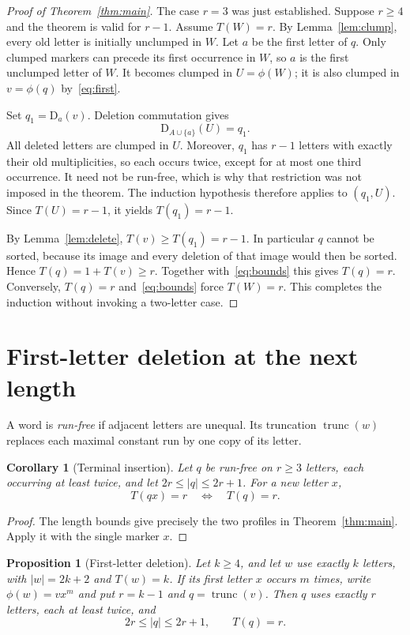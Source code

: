 \documentclass[11pt,a4paper]{article}
\newtheorem{corollary}[theorem]{Corollary}
\newtheorem{proposition}[theorem]{Proposition}
\DeclareMathOperator{\trunc}{trunc}
\newcommand{\D}{\mathrm{D}}
\begin{document}
\begin{proof}[Proof of Theorem~\ref{thm:main}]
The case $r=3$ was just established. Suppose $r\geq4$ and the theorem is
valid for $r-1$. Assume $T(W)=r$. By Lemma~\ref{lem:clump}, every old letter
is initially unclumped in $W$. Let $a$ be the first letter of $q$. Only
clumped markers can precede its first occurrence in $W$, so $a$ is the
first unclumped letter of $W$. It becomes clumped in $U=\phi(W)$; it is
also clumped in $v=\phi(q)$ by~\eqref{eq:first}.

Set $q_1=\D_a(v)$. Deletion commutation gives
\[
 \D_{A\cup\{a\}}(U)=q_1.
\]
All deleted letters are clumped in $U$. Moreover, $q_1$ has $r-1$ letters
with exactly their old multiplicities, so each occurs twice, except for at
most one third occurrence. It need not be run-free, which is why that
restriction was not imposed in the theorem. The induction hypothesis
therefore applies to $(q_1,U)$. Since $T(U)=r-1$, it yields $T(q_1)=r-1$.

By Lemma~\ref{lem:delete}, $T(v)\geq T(q_1)=r-1$. In particular $q$ cannot
be sorted, because its image and every deletion of that image would then
be sorted. Hence $T(q)=1+T(v)\geq r$. Together with~\eqref{eq:bounds} this
gives $T(q)=r$. Conversely, $T(q)=r$ and~\eqref{eq:bounds} force $T(W)=r$.
This completes the induction without invoking a two-letter case.
\end{proof}

\section{First-letter deletion at the next length}\label{sec:application}

A word is \emph{run-free} if adjacent letters are unequal. Its truncation
$\trunc(w)$ replaces each maximal constant run by one copy of its letter.

\begin{corollary}[Terminal insertion]\label{cor:terminal}
Let $q$ be run-free on $r\geq3$ letters, each occurring at least twice, and
let $2r\leq|q|\leq2r+1$. For a new letter $x$,
\[
 T(qx)=r\quad\Longleftrightarrow\quad T(q)=r.
\]
\end{corollary}

\begin{proof}
The length bounds give precisely the two profiles in
Theorem~\ref{thm:main}. Apply it with the single marker $x$.
\end{proof}

\begin{proposition}[First-letter deletion]\label{prop:application}
Let $k\geq4$, and let $w$ use exactly $k$ letters, with $|w|=2k+2$ and
$T(w)=k$. If its first letter $x$ occurs $m$ times, write
$\phi(w)=v x^m$ and put $r=k-1$ and $q=\trunc(v)$. Then $q$ uses exactly
$r$ letters, each at least twice, and
\[
 2r\leq |q|\leq2r+1,\qquad T(q)=r.
\]
\end{proposition}
\end{document}
